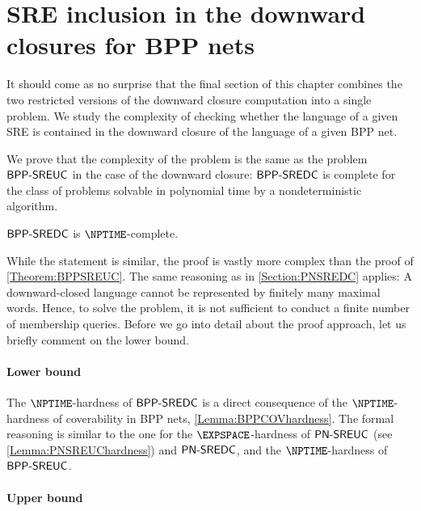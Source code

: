 \documentclass[../../diss.tex]{subfiles}
\begin{document}
\section{SRE inclusion in the downward closures for BPP nets}

It should come as no surprise that the final section of this chapter combines the two restricted versions of the downward closure computation into a single problem.
We study the complexity of checking whether the language of a given SRE is contained in the downward closure of the language of a given BPP net.

\begin{problem}
    \problemshort{($\SREBPPDC$)}
\end{problem}

We prove that the complexity of the problem is the same as the problem $\mathsf{BPP\text{-}SREUC}$ in the case of the downward closure:
$\SREBPPDC$ is complete for the class of problems solvable in polynomial time by a nondeterministic algorithm.

\begin{theorem}%
\label{Theorem:SREBPPDC}%
    $\SREBPPDC$ is $\NPTIME$-complete.
\end{theorem}

While the statement is similar, the proof is vastly more complex than the proof of \cref{Theorem:BPPSREUC}.
The same reasoning as in \cref{Section:PNSREDC} applies:
A downward-closed language cannot be represented by finitely many maximal words.
Hence, to solve the problem, it is not sufficient to conduct a finite number of membership queries.
Before we go into detail about the proof approach, let us briefly comment on the lower bound.

\paragraph{Lower bound}

The $\NPTIME$-hardness of $\SREBPPDC$ is a direct consequence of the $\NPTIME$-hardness of coverability in BPP nets, \cref{Lemma:BPPCOVhardness}.
The formal reasoning is similar to the one for the $\EXPSPACE$-hardness of $\mathsf{PN\text{-}SREUC}$ (see \cref{Lemma:PNSREUChardness}) and $\mathsf{PN\text{-}SREDC}$, and the $\NPTIME$-hardness of $\mathsf{BPP\text{-}SREUC}$.

\paragraph{Upper bound}
\end{document}
